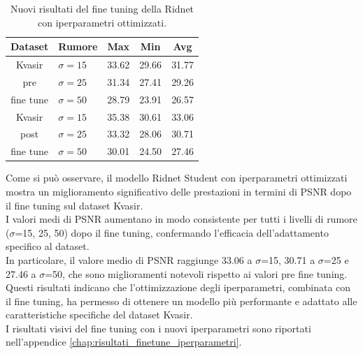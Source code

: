 \documentclass[12pt,a4paper,openright,twoside]{book}
\begin{document}
\begin{table}[h!]
\centering
\setlength{\tabcolsep}{10pt} %
\renewcommand{\arraystretch}{1.3} %
\begin{tabular}{!{\vrule width 1.5pt} c l 
                !{\vrule width 1.5pt} c|c|c 
                !{\vrule width 1.5pt}}
\hline
Dataset & Rumore & Max & Min & Avg \\
\hline
Kvasir          
 & $\sigma=15$ & 33.62 & 29.66 & 31.77 \\
pre
 &$\sigma=25$ &  31.34 & 27.41 & 29.26 \\
fine tune
 & $\sigma=50$ & 28.79 & 23.91 & 26.57 \\
\hline
Kvasir
 &$\sigma=15$ &  35.38 & 30.61 & 33.06 \\
post
 & $\sigma=25$ & 33.32 & 28.06 & 30.71 \\
fine tune
 &$\sigma=50$ &  30.01 & 24.50 & 27.46 \\
\bottomrule
\end{tabular}
\caption{Nuovi risultati del fine tuning della Ridnet con iperparametri ottimizzati.}
\end{table}
Come si può osservare, il modello Ridnet Student con iperparametri ottimizzati mostra un miglioramento significativo delle prestazioni in termini di PSNR dopo il fine tuning sul dataset Kvasir.\\
I valori medi di PSNR aumentano in modo consistente per tutti i livelli di rumore ($\sigma$=15, 25, 50) dopo il fine tuning, confermando l'efficacia dell'adattamento specifico al dataset.\\
In particolare, il valore medio di PSNR raggiunge 33.06 a $\sigma$=15, 30.71 a $\sigma$=25 e 27.46 a $\sigma$=50, che sono miglioramenti notevoli rispetto ai valori pre fine tuning.\\
Questi risultati indicano che l'ottimizzazione degli iperparametri, combinata con il fine tuning, ha permesso di ottenere un modello più performante e adattato alle caratteristiche specifiche del dataset Kvasir.\\
I risultati visivi del fine tuning con i nuovi iperparametri sono riportati nell'appendice \autoref{chap:risultati_finetune_iperparametri}.
\end{document}
